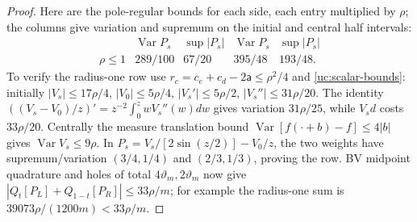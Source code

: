 \begin{proof}
Here are the pole-regular bounds for each side, each entry multiplied
by $\rho$; the columns give variation and supremum on the initial
and central half intervals:
\[
\begin{array}{ccccc}
 &\operatorname{Var}P_s&\sup|P_s|&\operatorname{Var}P_s&\sup|P_s|\\ \hline
\rho\leq1&289/100&67/20&395/48&193/48.
\end{array}
\]
To verify the radius-one row use $r_c=c_e+c_d-2\mathsf{a}\leq\rho^2/4$ and
\eqref{uc:scalar-bounds}: initially
$|V_s|\leq17\rho/4$, $|V_0|\leq5\rho/4$,
$|V_s'|\leq5\rho/2$, $|V_s''|\leq31\rho/20$.
The identity $((V_s-V_0)/z)'=z^{-2}\int_0^z wV_s''(w)dw$
gives variation $31\rho/25$, while $V_sd$ costs $33\rho/20$.
Centrally the measure translation bound
$\operatorname{Var}[f(\cdot+b)-f]\leq4|b|$ gives
$\operatorname{Var}V_s\leq9\rho$. In
$P_s=V_s/[2\sin(z/2)]-V_0/z$, the two weights have
supremum/variation $(3/4,1/4)$ and $(2/3,1/3)$, proving the row.
BV midpoint quadrature and holes of total $4\vartheta_m,2\vartheta_m$ now give
$|Q_t[P_L]+Q_{1-t}[P_R]|\leq33\rho/m$;
for example the radius-one sum is $39073\rho/(1200m)<33\rho/m$.


\end{proof}
